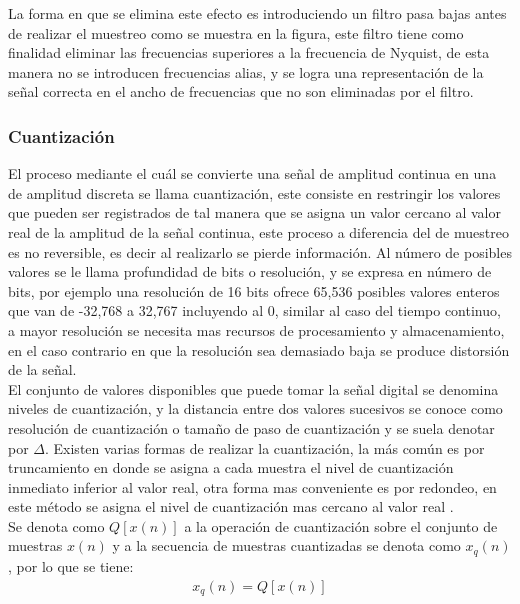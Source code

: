 La forma en que se elimina este efecto es introduciendo un filtro pasa bajas antes de realizar el muestreo como se muestra en la figura, este filtro tiene como finalidad eliminar las frecuencias superiores a la frecuencia de Nyquist, de esta manera no se introducen frecuencias alias, y se logra una representaci\'on de la señal correcta en el ancho de frecuencias que no son eliminadas por el filtro.\\




\subsubsection{Cuantizaci\'on}

El proceso mediante el cu\'al se convierte una señal de amplitud continua en una de amplitud discreta se llama cuantizaci\'on, este consiste en restringir los valores que pueden ser registrados de tal manera que se asigna un valor cercano al valor real de la amplitud de la señal continua, este proceso a diferencia del de muestreo es no reversible, es decir al realizarlo se pierde informaci\'on. Al n\'umero de posibles valores se le llama profundidad de bits o resoluci\'on, y se expresa en n\'umero de bits, por ejemplo una resoluci\'on de 16 bits ofrece 65,536 posibles valores enteros que van de -32,768 a 32,767 incluyendo al 0, similar al caso del tiempo continuo, a mayor resoluci\'on se necesita mas recursos de procesamiento y almacenamiento, en el caso contrario en que la resoluci\'on sea demasiado baja se produce distorsi\'on de la señal.\\


El conjunto de valores disponibles que puede tomar la señal digital se denomina niveles de cuantizaci\'on, y la distancia entre dos valores sucesivos se conoce como resoluci\'on de cuantizaci\'on o tamaño de paso de cuantizaci\'on y se suela denotar por $\Delta$. Existen varias formas de realizar la cuantizaci\'on, la m\'as com\'un es por truncamiento en donde se asigna a cada muestra el nivel de cuantizaci\'on inmediato inferior al valor real, otra forma mas conveniente es por redondeo, en este m\'etodo se asigna el nivel de cuantizaci\'on mas cercano al valor real \cite{proakis}. \\

Se denota como \begin{math}Q[x(n)]\end{math} a la operaci\'on de cuantizaci\'on sobre el conjunto de muestras \begin{math}x(n)\end{math} y a la secuencia de muestras cuantizadas se denota como \begin{math}x_q(n)\end{math}, por lo que se tiene:
\begin{align}
	x_q(n) = Q[x(n)]
\end{align}

